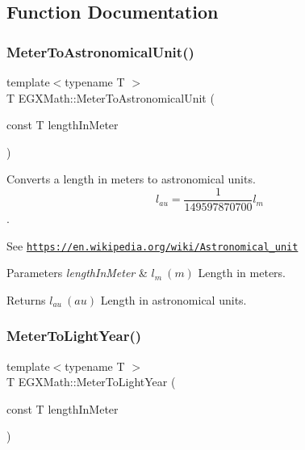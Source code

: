 \subsection{Function Documentation}
\mbox{\label{group___e_g_x_math-_conversions-_length_conversions-_meter-_astronomical_gadf1e5c63bba613fab5b94704df71994d}} 
\subsubsection{\texorpdfstring{Meter\+To\+Astronomical\+Unit()}{MeterToAstronomicalUnit()}}
{\footnotesize\ttfamily template$<$typename T $>$ \\
T E\+G\+X\+Math\+::\+Meter\+To\+Astronomical\+Unit (\begin{DoxyParamCaption}\item[{const T}]{length\+In\+Meter }\end{DoxyParamCaption})}



Converts a length in meters to astronomical units. \[ l_{au}= \frac{1}{149597870700} l_{m} \]. 

See \href{https://en.wikipedia.org/wiki/Astronomical_unit}{\tt https\+://en.\+wikipedia.\+org/wiki/\+Astronomical\+\_\+unit} 
\begin{DoxyParams}{Parameters}
{\em length\+In\+Meter} & $ l_{m}\ (m)$ Length in meters. \\
\hline
\end{DoxyParams}
\begin{DoxyReturn}{Returns}
$ l_{au}\ (au)$ Length in astronomical units. 
\end{DoxyReturn}
\mbox{\label{group___e_g_x_math-_conversions-_length_conversions-_meter-_astronomical_ga0dbb6d8e5d002475c0335934326b27d7}} 
\subsubsection{\texorpdfstring{Meter\+To\+Light\+Year()}{MeterToLightYear()}}
{\footnotesize\ttfamily template$<$typename T $>$ \\
T E\+G\+X\+Math\+::\+Meter\+To\+Light\+Year (\begin{DoxyParamCaption}\item[{const T}]{length\+In\+Meter }\end{DoxyParamCaption})}



